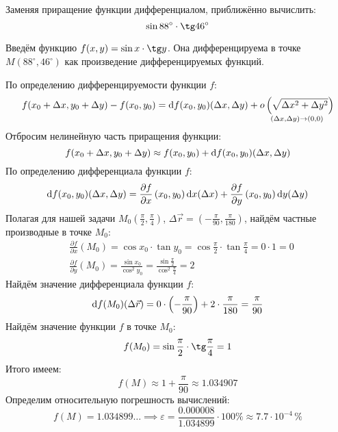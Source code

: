 \begin{problem}
Заменяя приращение функции дифференциалом, приближённо вычислить:
\[ \sin 88^{\circ}\cdot\tg 46^{\circ} \]
\end{problem}

\begin{solution}
  Введём функцию \( f(x,y)=\sin x\cdot\tg y \). Она дифференцируема в точке \( M(88^{\circ},46^{\circ}) \) как произведение дифференцируемых функций.

  По определению дифференцируемости функции \( f \):
  \[ f(x_0+\Delta x,y_0+\Delta y)-f(x_0,y_0)=\mathrm{d} f(x_0,y_0)(\Delta x,\Delta y)+\underset{(\Delta x,\Delta y)\to (0,0)}{o\left(\sqrt{\Delta x^2+\Delta y^2}\right)} \]
  Отбросим нелинейную часть приращения функции:
  \[ f(x_0+\Delta x,y_0+\Delta y)\approx f(x_0,y_0)+\mathrm{d} f(x_0,y_0)(\Delta x,\Delta y) \]
  По определению дифференциала функции \( f \):
  \[ \mathrm{d} f(x_0,y_0)(\Delta x,\Delta y)=\dfrac{\partial f}{\partial x}\left(x_0,y_0\right)\mathrm{d} x(\Delta x)+\dfrac{\partial f}{\partial y}\left(x_0,y_0\right)\mathrm{d} y(\Delta y) \]
  Полагая для нашей задачи \( M_0\left(\frac{\pi}{2},\frac{\pi}{4}\right) \), \( \Delta\vec{r}=\left(-\frac{\pi}{90},\frac{\pi}{180}\right) \), найдём частные производные в точке \( M_0 \):
  \begin{align*}
  &\frac{\partial f}{\partial x}(M_0) = \cos x_0 \cdot \tan y_0 = \cos\frac{\pi}{2} \cdot \tan\frac{\pi}{4} = 0 \cdot 1 = 0 \\
  &\frac{\partial f}{\partial y}(M_0) = \frac{\sin x_0}{\cos^2 y_0} = \frac{\sin\frac{\pi}{2}}{\cos^2\frac{\pi}{4}}= 2
  \end{align*}
  Найдём значение дифференциала функции \( f \):
  \[ \mathrm{d} f(M_0)(\Delta\vec{r})=0\cdot\left(-\dfrac{\pi}{90}\right)+2\cdot\dfrac{\pi}{180}=\dfrac{\pi}{90} \]
  Найдём значение функции \( f \) в точке \( M_0 \):
  \[ f(M_0)=\sin\frac{\pi}{2}\cdot\tg\frac{\pi}{4}=1 \]
  Итого имеем:
  \[ f(M)\approx 1+\dfrac{\pi}{90}\approx 1.034907 \]
  Определим относительную погрешность вычислений:
  \[ f(M)=1.034899\ldots\implies\varepsilon=\dfrac{0.000008}{1.034899}\cdot 100\%\approx 7.7\cdot 10^{-4}\,\% \]
\end{solution}